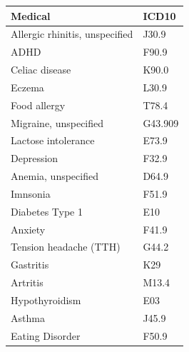 \begin{table}[H]
	\renewcommand{\arraystretch}{1.5}
\begin{tabular}{|ll}
\hline
\rowcolor[HTML]{FFCCC9} 
Medical                        & \multicolumn{1}{l|}{\cellcolor[HTML]{FFCCC9}ICD10} \\ \hline
Allergic rhinitis, unspecified & \multicolumn{1}{l|}{J30.9}                         \\
ADHD                           & F90.9                                              \\
Celiac disease                 & \multicolumn{1}{l|}{K90.0}                         \\
Eczema                         & \multicolumn{1}{l|}{L30.9}                         \\
Food allergy                   & \multicolumn{1}{l|}{T78.4}                         \\
Migraine, unspecified          & \multicolumn{1}{l|}{G43.909}                       \\
Lactose intolerance            & \multicolumn{1}{l|}{E73.9}                         \\
Depression                     & \multicolumn{1}{l|}{F32.9}                         \\
Anemia, unspecified            & \multicolumn{1}{l|}{D64.9}                         \\
Imnsonia                       & \multicolumn{1}{l|}{F51.9}                         \\
Diabetes Type 1                & \multicolumn{1}{l|}{E10}                           \\
Anxiety                        & \multicolumn{1}{l|}{F41.9}                         \\
Tension headache (TTH)         & \multicolumn{1}{l|}{G44.2}                         \\
Gastritis                      & \multicolumn{1}{l|}{K29}                           \\
Artritis                       & \multicolumn{1}{l|}{M13.4}                         \\
Hypothyroidism                 & \multicolumn{1}{l|}{E03}                           \\
Asthma                         & \multicolumn{1}{l|}{J45.9}                         \\
Eating Disorder                & \multicolumn{1}{l|}{F50.9}                         \\ \hline
\end{tabular}
\end{table}

